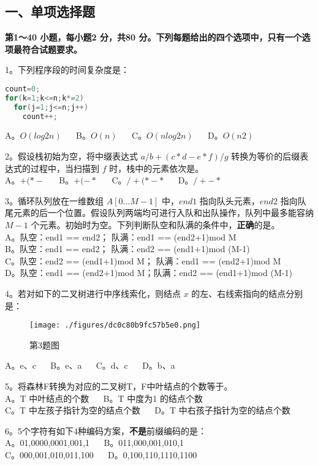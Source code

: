 
\subsection{一、单项选择题}
\textbf{第1～40 小题，每小题2 分，共80 分。下列每题给出的四个选项中，只有一个选项最符合试题要求。}

1。下列程序段的时间复杂度是：
\begin{lstlisting}[language=cpp]
count=0;
for(k=1;k<=n;k*=2)
  for(j=1;j<=n;j++)
    count++;
\end{lstlisting}
A。$O(log2n)$ $\quad$ B。$O(n)$ $\quad$ C。$O(nlog2n)$ $\quad$ D。$O(n2)$

2。假设栈初始为空，将中缀表达式 $a/b+(c*d-e*f)/g$ 转换为等价的后缀表达式的过程中，当扫描到 $f$ 时，栈中的元素依次是。 \\
A。$+ ( * -$  $\quad$ B。$+ ( - *$  $\quad$ C。$/ + ( * - *$  $\quad$ D。$/ + - *$

3。循环队列放在一维数组 $A[0...M-1]$ 中，$end1$ 指向队头元素，$end2$ 指向队尾元素的后一个位置。假设队列两端均可进行入队和出队操作，队列中最多能容纳 $M-1$ 个元素。初始时为空。下列判断队空和队满的条件中，\textbf{正确}的是。 \\
A。队空：end1 == end2； 队满：end1 == (end2+1)mod M \\
B。队空：end1 == end2； 队满：end2 == (end1+1)mod (M-1) \\
C。队空：end2 == (end1+1)mod M； 队满：end1 == (end2+1)mod M \\
D。队空：end1 == (end2+1)mod M；队满：end2 == (end1+1)mod (M-1)

4。若对如下的二叉树进行中序线索化，则结点 $x$ 的左、右线索指向的结点分别是：
\begin{figure}[ht]
\centering
\texttt{[image: ./figures/dc0c80b9fc57b5e0.png]}
\caption{第3题图} \label{fig_CSN14_1}
\end{figure}
A。e、c $\quad$ B。e、a $\quad$ C。d、c $\quad$ D。b、a

5。将森林F转换为对应的二叉树T，F中叶结点的个数等于。 \\
A。T 中叶结点的个数 $\quad$ B。T 中度为1 的结点个数 \\
C。T 中左孩子指针为空的结点个数 $\quad$ D。T 中右孩子指针为空的结点个数

6。5个字符有如下4种编码方案，\textbf{不是}前缀编码的是： \\
A。01,0000,0001,001,1 $\quad$ B。011,000,001,010,1 \\
C。000,001,010,011,100 $\quad$ D。0,100,110,1110,1100

